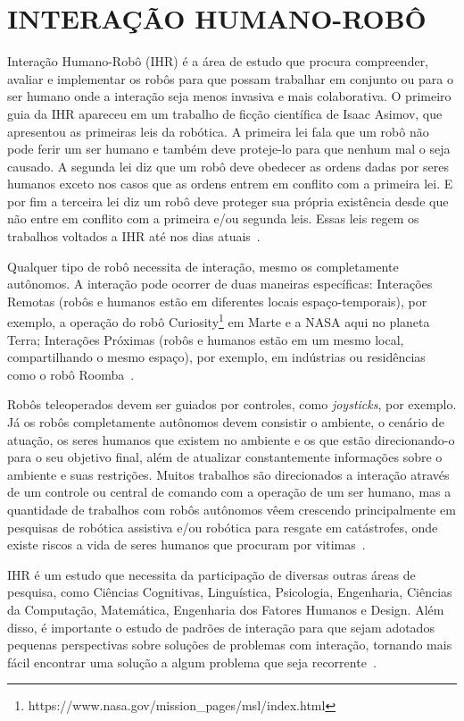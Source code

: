 \chapter{INTERAÇÃO HUMANO-ROBÔ}
\label{cap:ihr}
Interação Humano-Robô (IHR) é a área de estudo que procura compreender, avaliar e implementar os robôs para que possam trabalhar em conjunto ou para o ser humano onde a interação seja menos invasiva e mais colaborativa. O primeiro guia da IHR apareceu em um trabalho de ficção científica de Isaac Asimov, que apresentou as primeiras leis da robótica. A primeira lei fala que um robô não pode ferir um ser humano e também deve proteje-lo para que nenhum mal o seja causado. A segunda lei diz que um robô deve obedecer as ordens dadas por seres humanos exceto nos casos que as ordens entrem em conflito com a primeira lei. E por fim a terceira lei diz um robô deve proteger sua própria existência desde que não entre em conflito com a primeira e/ou segunda leis. Essas leis regem os trabalhos voltados a IHR até nos dias atuais~\cite{Goodrich:2007, Weiss:2010}.

Qualquer tipo de robô necessita de interação, mesmo os completamente autônomos. A interação pode ocorrer de duas maneiras específicas: Interações Remotas (robôs e humanos estão em diferentes locais espaço-temporais), por exemplo, a operação do robô Curiosity\footnote{https://www.nasa.gov/mission\_pages/msl/index.html} em Marte e a NASA aqui no planeta Terra; Interações Próximas (robôs e humanos estão em um mesmo local, compartilhando o mesmo espaço), por exemplo, em indústrias ou residências como o robô Roomba~\cite{Goodrich:2007}.

Robôs teleoperados devem ser guiados por controles, como \emph{joysticks}, por exemplo. Já os robôs completamente autônomos devem consistir o ambiente, o cenário de atuação, os seres humanos que existem no ambiente e os que estão direcionando-o para o seu objetivo final, além de atualizar constantemente informações sobre o ambiente e suas restrições. Muitos trabalhos são direcionados a interação através de um controle ou central de comando com a operação de um ser humano, mas a quantidade de trabalhos com robôs autônomos vêem crescendo principalmente em pesquisas de robótica assistiva e/ou robótica para resgate em catástrofes, onde existe riscos a vida de seres humanos que procuram por vitimas~\cite{Goodrich:2007, Weiss:2010}.

IHR é um estudo que necessita da participação de diversas outras áreas de pesquisa, como Ciências Cognitivas, Linguística, Psicologia, Engenharia, Ciências da Computação, Matemática, Engenharia dos Fatores Humanos e Design. Além disso, é importante o estudo de padrões de interação para que sejam adotados pequenas perspectivas sobre soluções de problemas com interação, tornando mais fácil encontrar uma solução a algum problema que seja recorrente~\cite{Goodrich:2007}.

